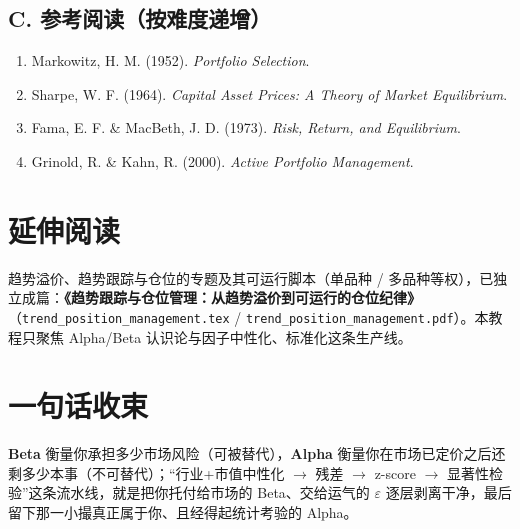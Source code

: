 \documentclass[UTF8,11pt]{ctexart}
\begin{document}
\subsection*{C. 参考阅读（按难度递增）}
\begin{enumerate}[itemsep=2pt]
\item Markowitz, H. M. (1952). \emph{Portfolio Selection}.
\item Sharpe, W. F. (1964). \emph{Capital Asset Prices: A Theory of Market Equilibrium}.
\item Fama, E. F. \& MacBeth, J. D. (1973). \emph{Risk, Return, and Equilibrium}.
\item Grinold, R. \& Kahn, R. (2000). \emph{Active Portfolio Management}.
\end{enumerate}


\section*{延伸阅读}
趋势溢价、趋势跟踪与仓位的专题及其可运行脚本（单品种 / 多品种等权），已独立成篇：\textbf{《趋势跟踪与仓位管理：从趋势溢价到可运行的仓位纪律》}（\texttt{trend\_position\_management.tex} / \texttt{trend\_position\_management.pdf}）。本教程只聚焦 Alpha/Beta 认识论与因子中性化、标准化这条生产线。

\section*{一句话收束}
\textbf{Beta} 衡量你承担多少市场风险（可被替代），\textbf{Alpha} 衡量你在市场已定价之后还剩多少本事（不可替代）；“行业+市值中性化 $\to$ 残差 $\to$ z-score $\to$ 显著性检验”这条流水线，就是把你托付给市场的 Beta、交给运气的 $\varepsilon$ 逐层剥离干净，最后留下那一小撮真正属于你、且经得起统计考验的 Alpha。
\end{document}
